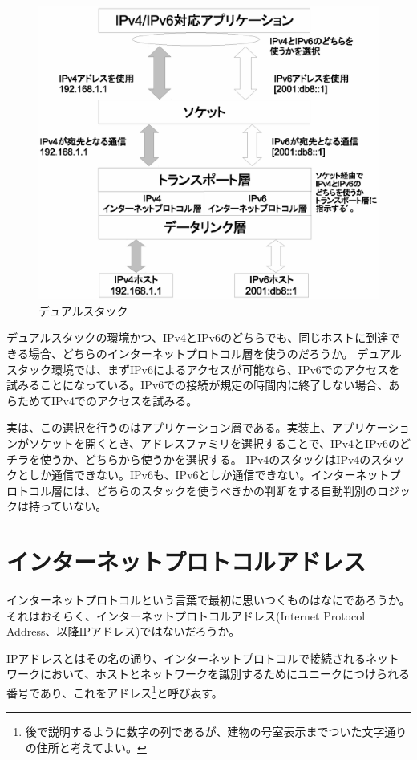 \begin{figure}[htbp]
	\includegraphics[width=12cm,clip]{draw/doublebind.eps}
	\caption{デュアルスタック}
	\label{fig:dualstack}
\end{figure}

デュアルスタックの環境かつ、IPv4とIPv6のどちらでも、同じホストに到達できる場合、どちらのインターネットプロトコル層を使うのだろうか。
デュアルスタック環境では、まずIPv6によるアクセスが可能なら、IPv6でのアクセスを試みることになっている。IPv6での接続が規定の時間内に終了しない場合、あらためてIPv4でのアクセスを試みる。

実は、この選択を行うのはアプリケーション層である。実装上、アプリケーションがソケットを開くとき、アドレスファミリを選択することで、IPv4とIPv6のどチラを使うか、どちらから使うかを選択する。
IPv4のスタックはIPv4のスタックとしか通信できない。IPv6も、IPv6としか通信できない。インターネットプロトコル層には、どちらのスタックを使うべきかの判断をする自動判別のロジックは持っていない。


\section{インターネットプロトコルアドレス}

インターネットプロトコルという言葉で最初に思いつくものはなにであろうか。それはおそらく、インターネットプロトコルアドレス(Internet Protocol Address、以降IPアドレス)ではないだろうか。

IPアドレスとはその名の通り、インターネットプロトコルで接続されるネットワークにおいて、ホストとネットワークを識別するためにユニークにつけられる番号であり、これをアドレス\footnote{後で説明するように数字の列であるが、建物の号室表示までついた文字通りの住所と考えてよい。}と呼び表す。


